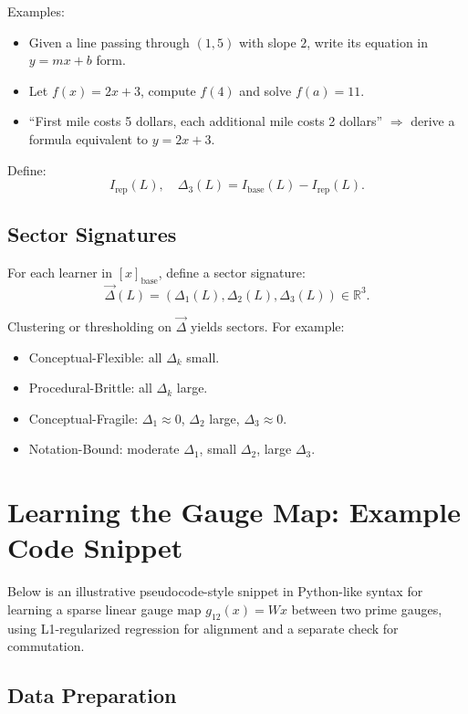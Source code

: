 \documentclass[11pt]{article}
\begin{document}
Examples:
\begin{itemize}[itemsep=3pt]
  \item Given a line passing through $(1,5)$ with slope $2$, write its equation in $y=mx+b$ form.
  \item Let $f(x)=2x+3$, compute $f(4)$ and solve $f(a)=11$.
  \item “First mile costs 5 dollars, each additional mile costs 2 dollars” $\Rightarrow$ derive a formula equivalent to $y=2x+3$.
\end{itemize}

Define:
\[
I_{\text{rep}}(L),\quad \Delta_3(L) = I_{\text{base}}(L) - I_{\text{rep}}(L).
\]

\subsection{Sector Signatures}

For each learner in $[x]_{\text{base}}$, define a sector signature:
\[
\vec{\Delta}(L) = (\Delta_1(L), \Delta_2(L), \Delta_3(L)) \in \mathbb{R}^3.
\]

Clustering or thresholding on $\vec{\Delta}$ yields sectors. For example:

\begin{itemize}[itemsep=3pt]
  \item Conceptual-Flexible: all $\Delta_k$ small.
  \item Procedural-Brittle: all $\Delta_k$ large.
  \item Conceptual-Fragile: $\Delta_1 \approx 0$, $\Delta_2$ large, $\Delta_3 \approx 0$.
  \item Notation-Bound: moderate $\Delta_1$, small $\Delta_2$, large $\Delta_3$.
\end{itemize}

\section{Learning the Gauge Map: Example Code Snippet}

Below is an illustrative pseudocode-style snippet in Python-like syntax for learning a sparse linear gauge map $g_{12}(x) = W x$ between two prime gauges, using L1-regularized regression for alignment and a separate check for commutation.

\subsection{Data Preparation}
\end{document}
